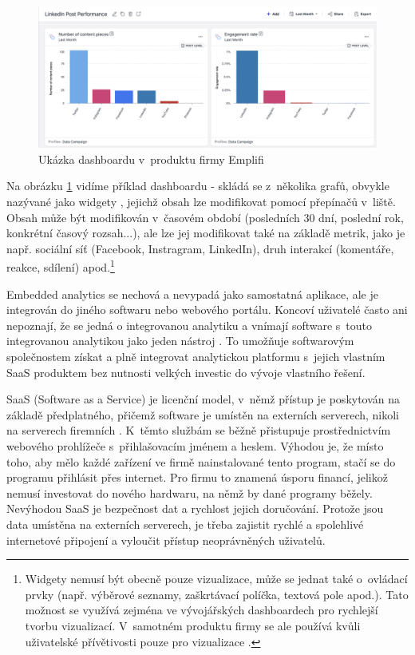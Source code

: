 \documentclass[czech, bc, kiv, he, iso690numb, viewonly]{fasthesis} %
\begin{document}
\begin{figure}[h]
	\centering
	\includegraphics[width=1\textwidth]{pictures/emplifi-dashboard-example-kopie.png}
	\caption{Ukázka dashboardu v~produktu firmy Emplifi \cite{emplifidashboardIMAGE}}
	\label{fig:emplifiDashUkazka}
\end{figure}

Na obrázku \ref{fig:emplifiDashUkazka} vidíme příklad dashboardu - skládá se z~několika grafů, obvykle nazývané jako widgety \cite{emplifiDashboard}, jejichž obsah lze modifikovat pomocí přepínačů v~liště. Obsah může být modifikován v~časovém období (posledních 30 dní, poslední rok, konkrétní časový rozsah...), ale lze jej modifikovat také na základě metrik, jako je např. sociální síť (Facebook, Instragram, LinkedIn), druh interakcí (komentáře, reakce, sdílení) apod.\footnote{Widgety nemusí být obecně pouze vizualizace, může se jednat také o~ovládací prvky (např. výběrové seznamy, zaškrtávací políčka, textová pole apod.). Tato možnost se využívá zejména ve vývojářských dashboardech pro rychlejší tvorbu vizualizací. V~samotném produktu firmy se ale používá kvůli uživatelské přívětivosti pouze pro vizualizace \cite{emplifiDashboard}. 
}

Embedded analytics se nechová a nevypadá jako samostatná aplikace, ale je integrován do jiného softwaru nebo webového portálu. Koncoví uživatelé často ani nepoznají, že se jedná o
integrovanou analytiku a vnímají software s~touto integrovanou analytikou jako jeden nástroj \cite{goodDataEmbedded}. To umožňuje softwarovým společnostem získat a plně
integrovat analytickou platformu s~jejich vlastním SaaS produktem bez nutnosti velkých investic do vývoje vlastního řešení. 

SaaS (Software as a Service) je licenční model, v~němž přístup je poskytován na základě předplatného, přičemž software je umístěn na externích serverech, nikoli na serverech firemních \cite{saasDefinition}.
K~těmto službám se běžně přistupuje prostřednictvím webového prohlížeče s~přihlašovacím jménem a heslem. Výhodou je, že místo toho, aby mělo každé zařízení ve firmě nainstalované
tento program, stačí se do programu přihlásit přes internet. Pro firmu to znamená úsporu financí, jelikož nemusí investovat do nového hardwaru, na němž by dané programy běžely. 
Nevýhodou SaaS je bezpečnost dat a rychlost jejich doručování. Protože jsou data umístěna na externích serverech, je třeba zajistit rychlé a spolehlivé internetové připojení a vyloučit
přístup neoprávněných uživatelů.
\end{document}
